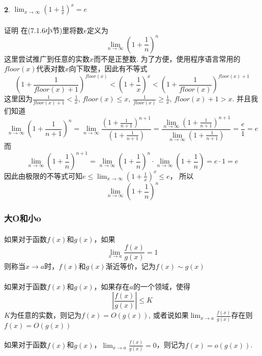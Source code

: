 \paragraph{}
\textbf{2}.  $\lim_{x \to \infty} (1 + \frac{1}{x})^x = e$

\paragraph{}
证明\: 在(7.1.6小节)里将数$e$定义为
$$
\lim_{n \to \infty} (1 + \frac{1}{n})^n
$$
这里尝试推广到任意的实数$x$而不是正整数.  为了方便，使用程序语言常用的$floor(x)$代表对数$x$向下取整，因此有不等式
$$
(1 + \frac{1}{floor(x) + 1})^{floor(x)} < (1 + \frac{1}{x})^x < (1 + \frac{1}{floor(x)})^{floor(x) + 1}
$$
这里因为$\frac{1}{floor(x) + 1} < \frac{1}{x}$, $floor(x) \leq x$, $\frac{1}{floor(x)} \geq \frac{1}{x}$, $floor(x) + 1 > x$. 并且我们知道
$$
\lim_{n\to \infty} (1 + \frac{1}{n + 1})^{n} = \lim_{n\to \infty} \frac{(1 + \frac{1}{n+1})^{n + 1}}{(1 + \frac{1}{n+1})} = \frac{ \lim_{n\to \infty} (1 + \frac{1}{n+1})^{n + 1}}{ \lim_{n\to \infty} (1 + \frac{1}{n+1}) } = \frac{e}{1} = e
$$
而
$$
\lim_{n\to \infty}  (1 + \frac{1}{n})^{n + 1} = \lim_{n\to \infty} (1 + \frac{1}{n})^{n} \cdot  \lim_{n\to \infty} (1 + \frac{1}{n}) = e \cdot 1 = e
$$
因此由极限的不等式可知$e \leq \lim_{x \to \infty} (1 + \frac{1}{x})^x \leq e$，
所以
$$
\lim_{n \to \infty} (1 + \frac{1}{n})^n
$$


\subsubsection{大O和小o}
\paragraph{}
如果对于函数$f(x)$和$g(x)$，如果
$$
\lim_{x\to a} \frac{f(x)}{g(x)} = 1
$$
则称当$x \to a$时，$f(x)$和$g(x)$渐近等价，记为$f(x) \sim g(x)$

\paragraph{}
如果对于函数$f(x)$和$g(x)$，如果存在$a$的一个领域，使得
$$
|\frac{f(x)}{g(x)}| \leq K
$$
$K$为任意的实数，则记为$f(x) = O(g(x))$, 或者说如果$\lim_{x\to a}\frac{f(x)}{g(x)}$存在则$f(x) = O(g(x))$

\paragraph{}
如果对于函数$f(x)$和$g(x)$，$\lim_{x\to a}\frac{f(x)}{g(x)} = 0$，则记为$f(x)= o(g(x))$.

